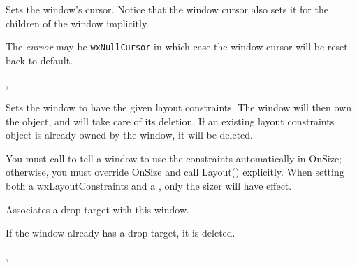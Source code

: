 \label{wxwindowsetcursor}


Sets the window's cursor. Notice that the window cursor also sets it for the
children of the window implicitly.

The {\it cursor} may be {\tt wxNullCursor} in which case the window cursor will
be reset back to default.




, 

\label{wxwindowsetconstraints}


Sets the window to have the given layout constraints. The window
will then own the object, and will take care of its deletion.
If an existing layout constraints object is already owned by the
window, it will be deleted.




You must call  to tell a window to use
the constraints automatically in OnSize; otherwise, you must override OnSize and call Layout()
explicitly. When setting both a wxLayoutConstraints and a , only the
sizer will have effect.

\label{wxwindowsetdroptarget}


Associates a drop target with this window.

If the window already has a drop target, it is deleted.


,

